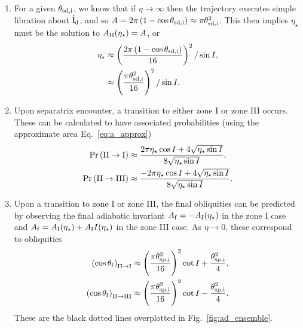 \documentclass[
        fleqn,
        usenatbib,
    ]{mnras}
\newcommand*{\bm}[1]{\boldsymbol{\mathbf{#1}}}
\newcommand*{\uv}[1]{\hat{\bm{#1}}}
\newcommand*{\p}[1]{\left(#1\right)}
\begin{document}
\begin{enumerate}
    \item For a given $\theta_{\rm sd, i}$, we know that if $\eta \to \infty$
        then the trajectory executes simple libration about $\uv{l}_{\rm d}$,
        and so $A = 2\pi\p{1 - \cos \theta_{\rm sd, i}} \approx \pi \theta_{\rm
        sd, i}^2$. This then implies $\eta_\star$ must be the solution to
        $A_{\rm II}(\eta_\star) = A$, or
        \begin{align}
            \eta_\star &\approx \p{\frac{2\pi\p{1 - \cos \theta_{\rm sd,i}}}{
                        16}}^2 / \sin I,\\
                    &\approx \p{\frac{\pi \theta_{\rm sd, i}^2}{16}}^2/\sin I.
        \end{align}

    \item Upon separatrix encounter, a transition to either zone I or zone
        III occurs. These can be calculated to have associated probabilities
        (using the approximate area Eq.~\eqref{eq:a_approx})
        \begin{subequations}
            \begin{align}
                \Pr\p{\rm II \to I} &\approx \frac{2\pi
                    \eta_{\star} \cos I + 4\sqrt{\eta_{\star}\sin
                    I}}{8\sqrt{\eta_{\star}\sin I}},\\
                \Pr\p{\rm II \to III} &\approx \frac{-2\pi
                    \eta_{\star} \cos I + 4\sqrt{\eta_{\star}\sin
                    I}}{8\sqrt{\eta_{\star}\sin I}}.
            \end{align}
        \end{subequations}

    \item Upon a transition to zone I or zone III, the final obliquities can
        be predicted by observing the final adiabatic invariant $A_{\rm f} = -A_{\rm
        I}(\eta_\star)$ in the zone I case and $A_{\rm f} = A_{\rm I}(\eta_\star) +
        A_{\rm I}I(\eta_\star)$ in the zone III case. As $\eta \to 0$, these
        correspond to obliquities
        \begin{subequations}\label{se:q_f_approx}
            \begin{align}
                \p{\cos \theta_{\rm f}}_{\rm II \to I} &\approx
                    \p{\frac{\pi \theta_{\rm sp, i}^2}{16}}^2 \cot I
                        + \frac{\theta_{\rm sp, i}^2}{4},\\
                \p{\cos \theta_{\rm f}}_{\rm II \to III} &\approx
                    \p{\frac{\pi \theta_{\rm sp, i}^2}{16}}^2 \cot I
                        - \frac{\theta_{\rm sp, i}^2}{4}.
            \end{align}
        \end{subequations}
        These are the black dotted lines overplotted in
        Fig.~\ref{fig:ad_ensemble}.
\end{enumerate}
\end{document}
